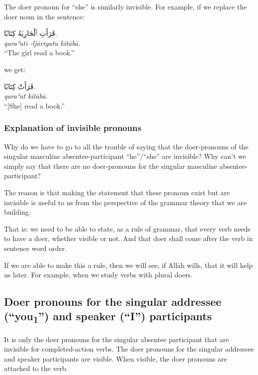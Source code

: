 \documentclass[
  10pt,
]{book}
\begin{document}
The doer pronoun for \enquote{she} is similarly invisible.
For example, if we replace the doer noun in the sentence:

\foreignlanguage{arabic}{قَرَأَتِ ٱلْجَارِيَةُ کِتَابًا.}\\
\emph{qaraʾati -ljāriyatu kitābā.}\\
\enquote{The girl read a book.}

we get:

\foreignlanguage{arabic}{قَرَأَتْ کِتَابًا.}\\
\emph{qaraʾat kitābā.}\\
\enquote{{[}She{]} read a book.}

\subsubsection{Explanation of invisible pronouns}\label{explanation-of-invisible-pronouns}

Why do we have to go to all the trouble of saying that the doer-pronouns of the singular masculine absentee-participant \enquote{he}/\enquote{she} are invisible? Why can't we simply say that there are no doer-pronouns for the singular masculine absentee-participant?

The reason is that making the statement that these pronoun exist but are invisible is useful to us from the perspective of the grammar theory that we are building.

That is: we need to be able to state, as a rule of grammar, that every verb needs to have a doer, whether visible or not. And that doer shall come after the verb in sentence word order.

If we are able to make this a rule, then we will see, if Allāh wills, that it will help us later. For example, when we study verbs with plural doers.

\subsection{\texorpdfstring{Doer pronouns for the singular addressee (\enquote{you\textsubscript{1}}) and speaker (\enquote{I}) participants}{Doer pronouns for the singular addressee (``you1'') and speaker (``I'') participants}}\label{doer-pronouns-for-the-singular-addressee-you1-and-speaker-i-participants}

It is only the doer pronouns for the singular absentee participant that are invisible for completed-action verbs. The doer pronouns for the singular addressee and speaker participants are visible. When visible, the doer pronouns are attached to the verb.
\end{document}
